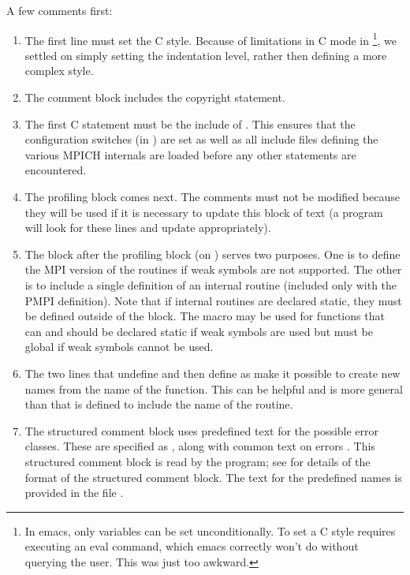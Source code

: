 \documentclass{article}
\begin{document}
A few comments first:
\begin{enumerate}
\item The first line must set the C style.  Because of limitations in
C mode in \footnote{In emacs, only variables can be set
unconditionally.  To set a C style requires executing an eval command,
which emacs correctly won't do without querying the user.  This was
just too awkward.}, we settled on simply setting the indentation
level, rather then defining a more complex style.

\item The comment block includes the copyright statement.

\item The first C statement must be the include of .  This
  ensures that the configuration switches (in ) are set as
  well as all include files defining the various MPICH internals are loaded
  before any other statements are encountered.

\item The profiling block comes next.  The comments must not be modified
  because they will be used if it is necessary to update this block of text (a
  program will look for these lines and update appropriately).

\item The block after the profiling block (on )
  serves two purposes.  One is to define the MPI version of the routines if
  weak symbols are not supported.  The other is to include a single definition
  of an internal routine (included only with the PMPI definition).
  Note that if internal routines are declared static, they must be
  defined outside of the  block.  
  The macro  may be used for
  functions that can and should be 
  declared static if weak symbols are used but must be global if weak
  symbols cannot be used.

\item The two lines that undefine  and then define
   as  make it possible to create new names
  from the name of the function.  This can be helpful and is more
  general than  that is defined to include
  the name of the routine.
  
\item The structured comment block uses predefined text for the possible error
  classes.  These are specified as , along with common text on
  errors .  This structured comment block is read by
  the  program; see \cite{doctext} for details of the
  format of the structured comment block.  The text for the predefined
  names is provided in the file .


\end{enumerate}
\end{document}

